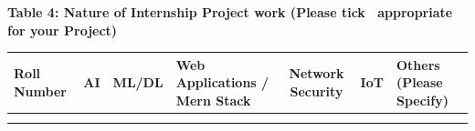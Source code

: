 \vspace{0.4cm}

\noindent \textbf{Table 4: Nature of Internship Project work (Please tick \checkmark\ appropriate for your Project)}

\vspace{0.2cm}

\begin{table}[H]
\centering
\small
\begin{tabularx}{\textwidth}{|p{2.2cm}|c|c|>{\centering\arraybackslash}p{2.5cm}|c|c|X|}
\hline
\textbf{Roll Number} & \textbf{AI} & \textbf{ML/DL} & \textbf{Web Applications / Mern Stack} & \textbf{Network Security} & \textbf{IoT} & \textbf{Others (Please Specify)} \\
\hline
& & & & & & \\
& & & & & & \\
\hline
\end{tabularx}
\end{table}
